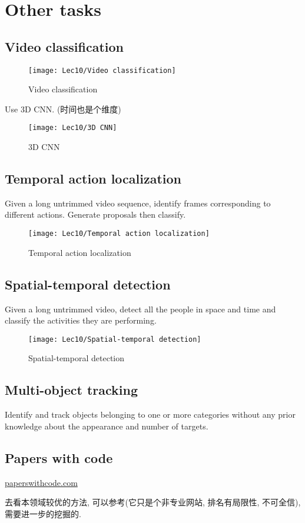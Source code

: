\section{Other tasks}

\subsection{Video classification}

\begin{figure}[H]
    \centering
    \texttt{[image: Lec10/Video classification]}
    \caption{Video classification}
\end{figure}

Use 3D CNN. (时间也是个维度)

\begin{figure}[H]
    \centering
    \texttt{[image: Lec10/3D CNN]}
    \caption{3D CNN}
\end{figure}

\subsection{Temporal action localization}
Given a long untrimmed video sequence, identify frames corresponding to different actions. Generate proposals then classify. 

\begin{figure}[H]
    \centering
    \texttt{[image: Lec10/Temporal action localization]}
    \caption{Temporal action localization}
\end{figure}

\subsection{Spatial-temporal detection}
Given a long untrimmed video, detect all the people in space and time and classify the activities they are performing. 

\begin{figure}[H]
    \centering
    \texttt{[image: Lec10/Spatial-temporal detection]}
    \caption{Spatial-temporal detection}
\end{figure}

\subsection{Multi-object tracking}
Identify and track objects belonging to one or more categories without any prior knowledge about the appearance and number of targets.

\subsection{Papers with code}

\href{https://paperswithcode.com/sota}{paperswithcode.com}

去看本领域较优的方法, 可以参考(它只是个非专业网站, 排名有局限性, 不可全信), 需要进一步的挖掘的. 